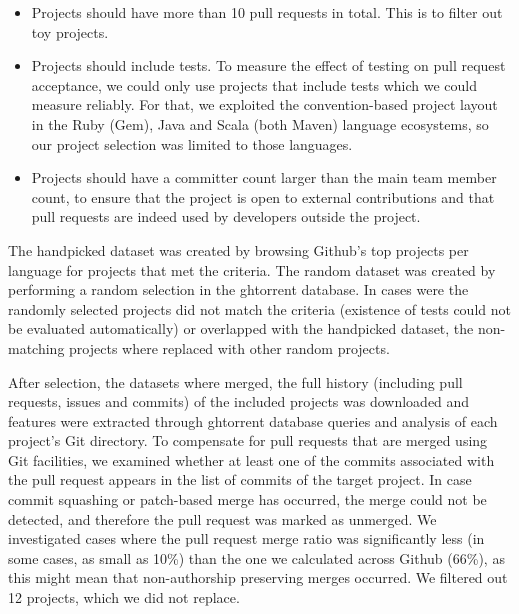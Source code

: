 \documentclass{sig-alternate}
\begin{document}
\begin{itemize}

  \item Projects should have more than 10 pull requests in total. This is
    to filter out toy projects. 

  \item Projects should include tests. To measure the effect of testing on pull
    request acceptance, we could only use projects that include tests which we
    could measure reliably. For that, we exploited the convention-based project
    layout in the Ruby (Gem), Java and Scala (both Maven) language ecosystems,
    so our project selection was limited to those languages. 

  \item Projects should have a committer count larger than the main team member
    count, to ensure that the project is open to external contributions and that
    pull requests are indeed used by developers outside the project.

\end{itemize}

The \textsf{handpicked} dataset was created by browsing Github's top projects
per language for projects that met the criteria. The \textsf{random} dataset
was created by performing a random selection in the {\sc ght}orrent database. In
cases were the randomly selected projects did not match the criteria (existence
of tests could not be evaluated automatically) or overlapped with the
\textsf{handpicked} dataset, the non-matching projects where replaced with
other random projects. 

After selection, the datasets where merged, the full history (including pull
requests, issues and commits) of the included projects was downloaded and
features were extracted through {\sc ght}orrent database queries and analysis of
each project's Git directory. To compensate for pull requests that are merged
using Git facilities, we examined whether at least one of the commits associated
with the pull request appears in the list of commits of the target project. In
case commit squashing or patch-based merge has occurred, the merge could not be
detected, and therefore the pull request was marked as unmerged. We investigated
cases where the pull request merge ratio was significantly less (in some cases,
as small as 10\%) than the one we calculated across Github (66\%), as this might
mean that non-authorship preserving merges occurred. We filtered out 12
projects, which we did not replace. 
\end{document}
